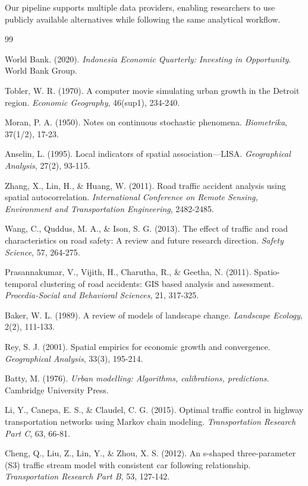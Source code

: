 \documentclass[11pt,a4paper]{article}
\begin{document}
Our pipeline supports multiple data providers, enabling researchers to use publicly available alternatives while following the same analytical workflow.

\begin{thebibliography}{99}

World Bank. (2020). \textit{Indonesia Economic Quarterly: Investing in Opportunity}. World Bank Group.

Tobler, W. R. (1970). A computer movie simulating urban growth in the Detroit region. \textit{Economic Geography}, 46(sup1), 234-240.

Moran, P. A. (1950). Notes on continuous stochastic phenomena. \textit{Biometrika}, 37(1/2), 17-23.

Anselin, L. (1995). Local indicators of spatial association---LISA. \textit{Geographical Analysis}, 27(2), 93-115.

Zhang, X., Lin, H., \& Huang, W. (2011). Road traffic accident analysis using spatial autocorrelation. \textit{International Conference on Remote Sensing, Environment and Transportation Engineering}, 2482-2485.

Wang, C., Quddus, M. A., \& Ison, S. G. (2013). The effect of traffic and road characteristics on road safety: A review and future research direction. \textit{Safety Science}, 57, 264-275.

Prasannakumar, V., Vijith, H., Charutha, R., \& Geetha, N. (2011). Spatio-temporal clustering of road accidents: GIS based analysis and assessment. \textit{Procedia-Social and Behavioral Sciences}, 21, 317-325.

Baker, W. L. (1989). A review of models of landscape change. \textit{Landscape Ecology}, 2(2), 111-133.

Rey, S. J. (2001). Spatial empirics for economic growth and convergence. \textit{Geographical Analysis}, 33(3), 195-214.

Batty, M. (1976). \textit{Urban modelling: Algorithms, calibrations, predictions}. Cambridge University Press.

Li, Y., Canepa, E. S., \& Claudel, C. G. (2015). Optimal traffic control in highway transportation networks using Markov chain modeling. \textit{Transportation Research Part C}, 63, 66-81.

Cheng, Q., Liu, Z., Lin, Y., \& Zhou, X. S. (2012). An s-shaped three-parameter (S3) traffic stream model with consistent car following relationship. \textit{Transportation Research Part B}, 53, 127-142.


\end{thebibliography}
\end{document}
